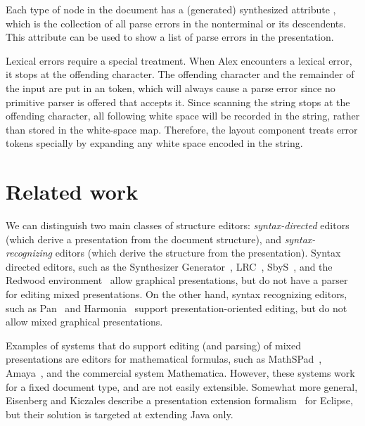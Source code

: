 \documentclass{article}[10pt]
\begin{document}
Each type of node in the document has a (generated) synthesized attribute , which is the collection of all parse errors in the nonterminal or its descendents. This attribute can be used to show a list of parse errors in the presentation. 


Lexical errors require a special treatment. When Alex encounters a lexical error, it stops at the offending character. The offending character and the remainder of the input are put in an  token, which will always cause a parse error since no primitive parser is offered that accepts it. Since scanning the string stops at the offending character, all following white space  will be recorded in the string, rather than stored in the white-space map. Therefore, the layout component treats error tokens specially by expanding any white space encoded in the string. %






%
\section{Related work}\label{sect:relatedWork}
%


We can distinguish two main classes of structure editors: {\em syntax-directed} editors (which derive a presentation from the document structure), and {\em syntax-recognizing} editors (which derive the structure from the presentation). Syntax directed editors, such as the Synthesizer Generator~\cite{reps84synGen}, LRC~\cite{saraiva00lrc}, SbyS~\cite{magnusson90orm}, and the Redwood environment~\cite{westphal04redwood} allow graphical presentations, but do not have a parser for editing mixed presentations. On the other hand, syntax recognizing editors, such as Pan~\cite{ballance92pan} and Harmonia~\cite{boshernitsan01harmonia} support presentation-oriented editing, but do not allow mixed graphical presentations.

Examples of systems that do support editing (and parsing) of mixed presentations are editors for mathematical formulas, such as MathSPad~\cite{verhoeven00mathspad},  Amaya~\cite{amaya08}, and the commercial system Mathematica. However, these systems work for a fixed document type, and are not easily extensible. Somewhat more general, Eisenberg and Kiczales describe a presentation extension formalism~\cite{eisenberg07presExtension} for Eclipse, but their solution is targeted at extending Java only.
\end{document}
